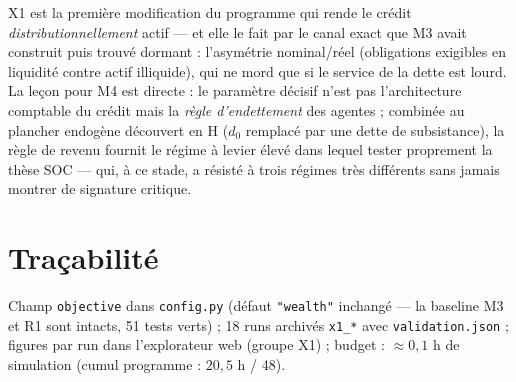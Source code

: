 \documentclass[11pt,a4paper]{article}
\newcommand{\code}[1]{\texttt{#1}}
\begin{document}
X1 est la première modification du programme qui rende le crédit
\emph{distributionnellement} actif — et elle le fait par le canal exact que
M3 avait construit puis trouvé dormant : l'asymétrie nominal/réel
(obligations exigibles en liquidité contre actif illiquide), qui ne mord que
si le service de la dette est lourd. La leçon pour M4 est directe : le
paramètre décisif n'est pas l'architecture comptable du crédit mais la
\emph{règle d'endettement} des agentes ; combinée au plancher endogène
découvert en H ($d_0$ remplacé par une dette de subsistance), la règle de
revenu fournit le régime à levier élevé dans lequel tester proprement la
thèse SOC — qui, à ce stade, a résisté à trois régimes très différents sans
jamais montrer de signature critique.

\section{Traçabilité}

Champ \code{objective} dans \code{config.py} (défaut \code{"wealth"}
inchangé — la baseline M3 et R1 sont intacts, 51 tests verts) ; 18 runs
archivés \code{x1\_*} avec \code{validation.json} ; figures par run dans
l'explorateur web (groupe X1) ; budget : $\approx 0{,}1$ h de simulation
(cumul programme : $20{,}5$ h / 48).
\end{document}
